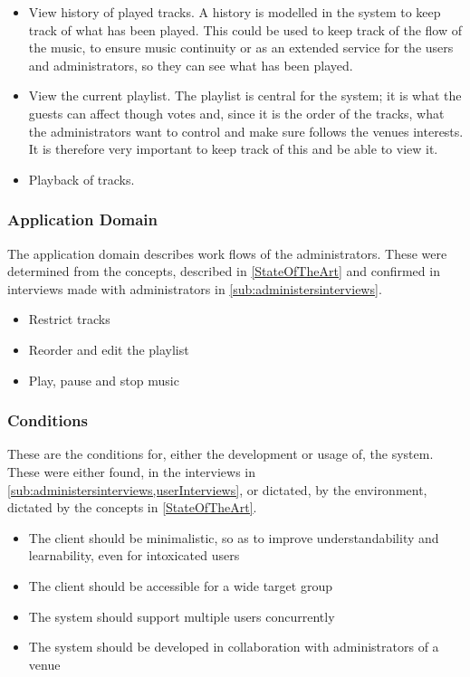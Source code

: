 \begin{itemize}
    \item View history of played tracks. A history is modelled in the system to keep track of what has been played. This could be used to keep track of the flow of the music, to ensure music continuity or as an extended service for the users and administrators, so they can see what has been played.
		\item View the current playlist. The playlist is central for the system; it is what the guests can affect though votes and, since it is the order of the tracks, what the administrators want to control and make sure follows the venues interests. It is therefore very important to keep track of this and be able to view it.
    \item Playback of tracks.
\end{itemize}

\subsubsection{Application Domain}
The application domain describes work flows of the administrators. These were determined from the concepts, described in \cref{StateOfTheArt} and confirmed in interviews made with administrators in \cref{sub:administersinterviews}.
\begin{itemize}
    \item Restrict tracks
		\item Reorder and edit the playlist
    \item Play, pause and stop music
\end{itemize}

\subsubsection{Conditions}
These are the conditions for, either the development or usage of, the system. These were either found, in the interviews in \cref{sub:administersinterviews,userInterviews}, or dictated, by the environment, dictated by the concepts in \cref{StateOfTheArt}.
\begin{itemize}
  \item The client should be minimalistic, so as to improve understandability and learnability, even for intoxicated users
	\item The client should be accessible for a wide target group
	\item The system should support multiple users concurrently
	\item The system should be developed in collaboration with administrators of a venue
\end{itemize}

